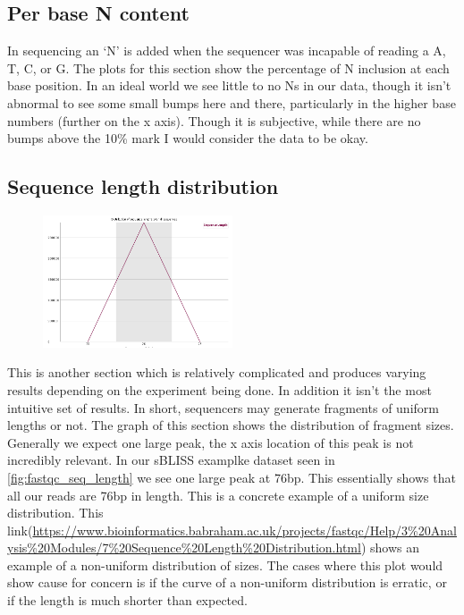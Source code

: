 \subsection{Per base N content \label{subsec:fastqc_N_content}}
In sequencing an `N' is added when the sequencer was incapable of reading a A, T, C, or G. The plots for this section show the percentage of N inclusion at each base position. In an ideal world we see little to no Ns in our data, though it isn't abnormal to see some small bumps here and there, particularly in the higher base numbers (further on the x axis). Though it is subjective, while there are no bumps above the 10\% mark I would consider the data to be okay.

\subsection{Sequence length distribution \label{subsec:fastqc_seq_length}}
\begin{figure}
  \begin{center}
    \includegraphics[width=0.5\textwidth]{figures/FastQC_seq_length_distribution.png}
  \end{center}
  \label{fig:fastqc_seq_length}
\end{figure}
This is another section which is relatively complicated and produces varying results depending on the experiment being done. In addition it isn't the most intuitive set of results. In short, sequencers may generate fragments of uniform lengths or not. The graph of this section shows the distribution of fragment sizes. Generally we expect one large peak, the x axis location of this peak is not incredibly relevant. In our sBLISS examplke dataset seen in \autoref{fig:fastqc_seq_length} we see one large peak at 76bp. This essentially shows that all our reads are 76bp in length. This is a concrete example of a uniform size distribution. This link(\url{https://www.bioinformatics.babraham.ac.uk/projects/fastqc/Help/3\%20Analysis\%20Modules/7\%20Sequence\%20Length\%20Distribution.html}) shows an example of a non-uniform distribution of sizes. The cases where this plot would show cause for concern is if the curve of a non-uniform distribution is erratic, or if the length is much shorter than expected.

